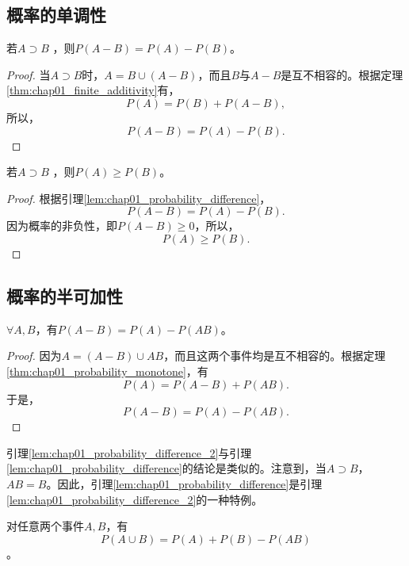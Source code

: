\subsection{概率的单调性}
\begin{lemma}\label{lem:chap01_probability_difference}
若$A\supset B$ ，则$P(A-B)=P(A)-P(B)$。
\end{lemma}
\begin{proof}
    当$A\supset B$时，$A = B \cup (A-B)$，而且$B$与$A-B$是互不相容的。根据定理\ref{thm:chap01_finite_additivity}有，
    $$
    P(A) = P(B) + P(A-B),
    $$
    所以，
    $$
    P(A-B) = P(A) - P(B).
    $$
\end{proof}
\begin{theorem}[概率的单调性]\label{thm:chap01_probability_monotone}
    若$A\supset B$ ，则$P(A)\geq P(B)$。
\end{theorem}
\begin{proof}
根据引理\ref{lem:chap01_probability_difference}，$$P(A-B) = P(A) - P(B).$$
因为概率的非负性，即$P(A-B) \geq 0$，所以，
$$
P(A) \geq P(B).
$$
\end{proof}

\subsection{概率的半可加性}
\begin{lemma}\label{lem:chap01_probability_difference_2}
    $\forall A,B$，有$P(A-B)=P(A)-P(AB)$。
\end{lemma}
\begin{proof}
    因为$A = (A-B) \cup AB$，而且这两个事件均是互不相容的。根据定理\ref{thm:chap01_probability_monotone}，有
    $$
    P(A) = P(A-B) + P(AB).
    $$
    于是，
    $$
    P(A-B) = P(A) - P(AB).
    $$
\end{proof}
\begin{remark}
    引理\ref{lem:chap01_probability_difference_2}与引理\ref{lem:chap01_probability_difference}的结论是类似的。注意到，当$A\supset B$，$AB=B$。因此，引理\ref{lem:chap01_probability_difference}是引理\ref{lem:chap01_probability_difference_2}的一种特例。
\end{remark}
对任意两个事件$A,B$，有$$P(A\cup B)=P(A)+P(B)-P(AB)$$。

